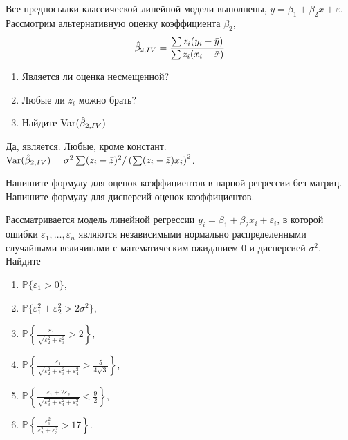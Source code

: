 \documentclass[pdftex,11pt,openany]{book}
\begin{document}
\begin{problem}
Все предпосылки классической линейной модели выполнены, $y=\beta_1+\beta_2 x+\varepsilon$. Рассмотрим альтернативную оценку коэффициента $\beta_2$,
\begin{equation}
\hat{\beta}_{2,IV}=\frac{\sum z_i(y_i-\bar{y})}{\sum z_i(x_i-\bar{x})}
\end{equation}
\begin{enumerate}
\item Является ли оценка несмещенной?
\item Любые ли $z_i$ можно брать?
\item Найдите $\operatorname{Var}(\hat{\beta}_{2,IV})$
\end{enumerate}
\end{problem}

\begin{solution}
Да, является. Любые, кроме констант. $\operatorname{Var}(\hat{\beta}_{2,IV})=\sigma^2 \sum (z_i-\bar{z})^2/ \left(\sum (z_i-\bar{z})x_i \right)^2 $.
\end{solution}

\begin{problem}
Напишите формулу для оценок коэффициентов в парной регрессии без матриц. Напишите формулу для дисперсий оценок коэффициентов.
\end{problem}

\begin{solution}
\end{solution}


\begin{problem}
Рассматривается модель линейной регрессии $y_i = \beta_1 + \beta_2x_i + \varepsilon_i$, в которой ошибки $\varepsilon_1, \ldots, \varepsilon_n$ являются независимыми нормально распределенными случайными величинами с математическим ожиданием $0$ и дисперсией $\sigma^2$. Найдите

\begin{enumerate}
  \item $\mathbb{P}\{\varepsilon_1 > 0\}$, 
  \item $\mathbb{P}\{\varepsilon_1^2 + \varepsilon_2^2 > 2\sigma^2\}$,
  \item $\mathbb{P}\left\{\frac{\varepsilon_1}{\sqrt{\varepsilon_2^2 + \varepsilon_3^2}} > 2 \right\}$,	
  \item $\mathbb{P}\left\{\frac{\varepsilon_1}{\sqrt{\varepsilon_2^2 + \varepsilon_3^2 + \varepsilon_4^2}} > \frac{5}{4\sqrt{3}} \right\}$,
  \item $\mathbb{P}\left\{\frac{\varepsilon_1 + 2\varepsilon_2}{\sqrt{\varepsilon_3^2 + \varepsilon_4^2 + \varepsilon_5^2}} < \frac{9}{2} \right\}$,
  \item $\mathbb{P}\left\{\frac{\varepsilon_1^2}{\varepsilon_2^2 + \varepsilon_3^2} > 17 \right\}$.
\end{enumerate}
\end{problem}
\end{document}
